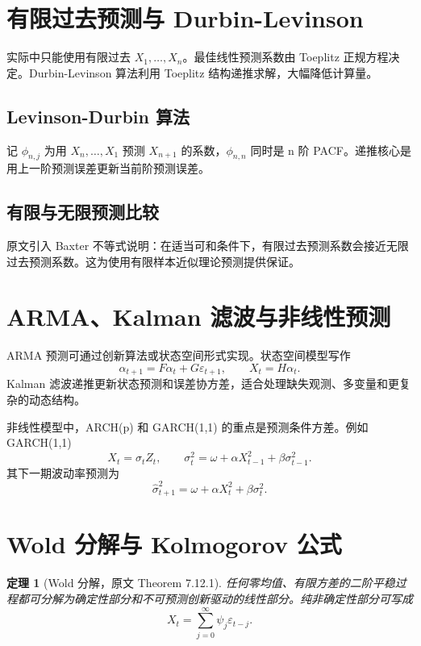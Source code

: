 \documentclass[11pt,a4paper,openany]{ctexbook}
\newtheorem{theorem}{定理}[section]
\begin{document}
\section{有限过去预测与 Durbin-Levinson}

实际中只能使用有限过去 \(X_1,\ldots,X_n\)。最佳线性预测系数由 Toeplitz 正规方程决定。Durbin-Levinson 算法利用 Toeplitz 结构递推求解，大幅降低计算量。

\subsection{Levinson-Durbin 算法}

记 \(\phi_{n,j}\) 为用 \(X_n,\ldots,X_1\) 预测 \(X_{n+1}\) 的系数，\(\phi_{n,n}\) 同时是 n 阶 PACF。递推核心是用上一阶预测误差更新当前阶预测误差。

\subsection{有限与无限预测比较}

原文引入 Baxter 不等式说明：在适当可和条件下，有限过去预测系数会接近无限过去预测系数。这为使用有限样本近似理论预测提供保证。

\section{ARMA、Kalman 滤波与非线性预测}

ARMA 预测可通过创新算法或状态空间形式实现。状态空间模型写作
\[
  \alpha_{t+1}=F\alpha_t+G\varepsilon_{t+1},\qquad
  X_t=H\alpha_t.
\]
Kalman 滤波递推更新状态预测和误差协方差，适合处理缺失观测、多变量和更复杂的动态结构。

非线性模型中，ARCH(p) 和 GARCH(1,1) 的重点是预测条件方差。例如 GARCH(1,1)
\[
  X_t=\sigma_tZ_t,\qquad
  \sigma_t^2=\omega+\alpha X_{t-1}^2+\beta\sigma_{t-1}^2.
\]
其下一期波动率预测为
\[
  \hat\sigma_{t+1}^2=\omega+\alpha X_t^2+\beta\sigma_t^2.
\]

\section{Wold 分解与 Kolmogorov 公式}

\begin{theorem}[Wold 分解，原文 Theorem 7.12.1]
任何零均值、有限方差的二阶平稳过程都可分解为确定性部分和不可预测创新驱动的线性部分。纯非确定性部分可写成
\[
  X_t=\sum_{j=0}^{\infty}\psi_j\varepsilon_{t-j}.
\]
\end{theorem}
\end{document}
